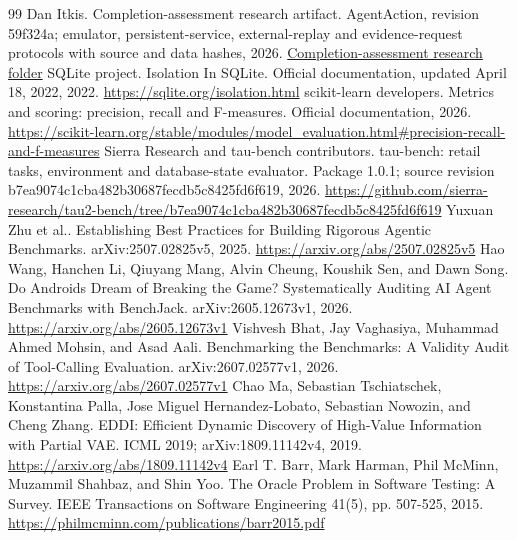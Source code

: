 \documentclass[11pt]{article}
\begin{document}
\begin{thebibliography}{99}
 Dan Itkis. Completion-assessment research artifact. AgentAction, revision 59f324a; emulator, persistent-service, external-replay and evidence-request protocols with source and data hashes, 2026. \href{https://github.com/dinpd/AgentAction/tree/59f324a33fe2fd04ae167e5bbd4cac0330c65c9e/research/completion-assessment}{Completion-assessment research folder}
 SQLite project. Isolation In SQLite. Official documentation, updated April 18, 2022, 2022. \url{https://sqlite.org/isolation.html}
 scikit-learn developers. Metrics and scoring: precision, recall and F-measures. Official documentation, 2026. \url{https://scikit-learn.org/stable/modules/model_evaluation.html#precision-recall-and-f-measures}
 Sierra Research and tau-bench contributors. tau-bench: retail tasks, environment and database-state evaluator. Package 1.0.1; source revision b7ea9074c1cba482b30687fecdb5c8425fd6f619, 2026. \url{https://github.com/sierra-research/tau2-bench/tree/b7ea9074c1cba482b30687fecdb5c8425fd6f619}
 Yuxuan Zhu et al.. Establishing Best Practices for Building Rigorous Agentic Benchmarks. arXiv:2507.02825v5, 2025. \url{https://arxiv.org/abs/2507.02825v5}
 Hao Wang, Hanchen Li, Qiuyang Mang, Alvin Cheung, Koushik Sen, and Dawn Song. Do Androids Dream of Breaking the Game? Systematically Auditing AI Agent Benchmarks with BenchJack. arXiv:2605.12673v1, 2026. \url{https://arxiv.org/abs/2605.12673v1}
 Vishvesh Bhat, Jay Vaghasiya, Muhammad Ahmed Mohsin, and Asad Aali. Benchmarking the Benchmarks: A Validity Audit of Tool-Calling Evaluation. arXiv:2607.02577v1, 2026. \url{https://arxiv.org/abs/2607.02577v1}
 Chao Ma, Sebastian Tschiatschek, Konstantina Palla, Jose Miguel Hernandez-Lobato, Sebastian Nowozin, and Cheng Zhang. EDDI: Efficient Dynamic Discovery of High-Value Information with Partial VAE. ICML 2019; arXiv:1809.11142v4, 2019. \url{https://arxiv.org/abs/1809.11142v4}
 Earl T. Barr, Mark Harman, Phil McMinn, Muzammil Shahbaz, and Shin Yoo. The Oracle Problem in Software Testing: A Survey. IEEE Transactions on Software Engineering 41(5), pp. 507-525, 2015. \url{https://philmcminn.com/publications/barr2015.pdf}
\end{thebibliography}
\end{document}
